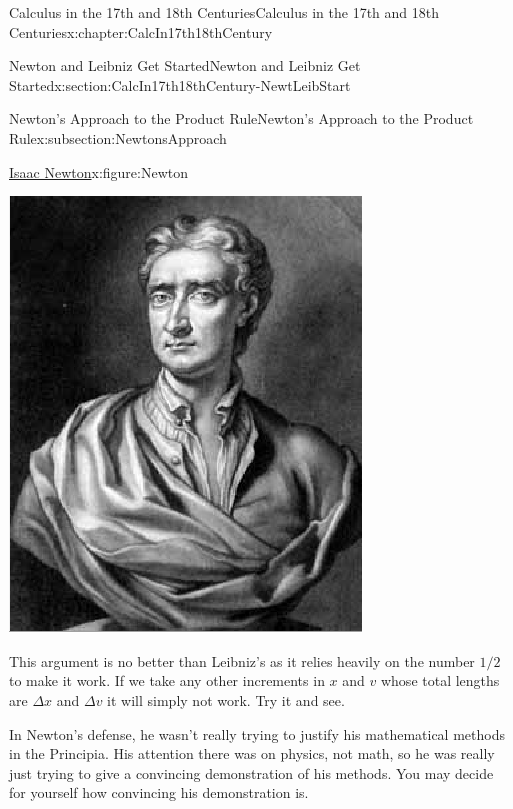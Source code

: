 \begin{chapterptx}{Calculus in the 17th and 18th Centuries}{}{Calculus in the 17th and 18th Centuries}{}{}{x:chapter:CalcIn17th18thCentury}
\begin{sectionptx}{Newton and Leibniz Get Started}{}{Newton and Leibniz Get Started}{}{}{x:section:CalcIn17th18thCentury-NewtLeibStart}
\begin{subsectionptx}{Newton's Approach to the Product Rule}{}{Newton's Approach to the Product Rule}{}{}{x:subsection:NewtonsApproach}
\begin{figureptx}{\href{https://mathshistory.st-andrews.ac.uk/Biographies/Newton/}{Isaac Newton}\protect\footnotemark{}}{x:figure:Newton}{}
\begin{image}{0.325}{0.35}{0.325}
					\includegraphics[width=\linewidth]{external/images/Newton.png}
				\end{image}%
				\tcblower
			\end{figureptx}%
			This argument is no better than Leibniz's as it relies heavily on the number \(1/2\) to make it work.  If we take any other increments in \(x\) and \(v\) whose total lengths are \(\Delta x\) and \(\Delta v\) it will simply not work.  Try it and see.%
			\par
			In Newton's defense, he wasn't really trying to justify his mathematical methods in the Principia.  His attention there was on physics, not math, so he was really just trying to give a convincing demonstration of his methods.  You may decide for yourself how convincing his demonstration is.%
			\par

\end{subsectionptx}
\end{sectionptx}
\end{chapterptx}
